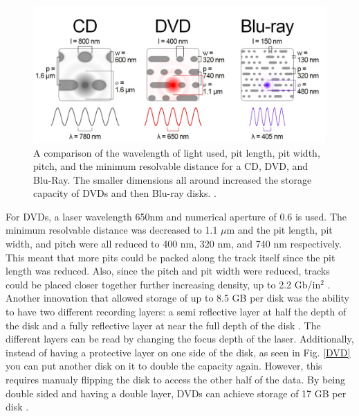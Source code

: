 \documentclass[ notitlepage, numerical, 11pt]{revtex4-1} %
\begin{document}
\begin{figure}[H]
\centerline{\includegraphics[scale=.55]{comparison.jpg}}
\caption{A comparison of the wavelength of light used, pit length, pit width, pitch, and the minimum resolvable distance for a CD, DVD, and Blu-Ray. The smaller dimensions all around increased the storage capacity of DVDs and then Blu-ray disks. \cite{wikiHolo}.}
\label{comparison}
\end{figure} 
For DVDs, a laser wavelength 650nm and numerical aperture of 0.6 is used. The minimum resolvable distance was decreased to 1.1 $\mu$m and the pit length, pit width, and pitch were all reduced to 400 nm, 320 nm, and 740 nm respectively. This meant that more pits could be packed along the track itself since the pit length was reduced. Also, since the pitch and pit width were reduced, tracks could be placed closer together further increasing density, up to 2.2 Gb/in$^2$ \cite{wikiHolo}. Another innovation that allowed storage of up to 8.5 GB per disk was the ability to have two different recording layers: a semi reflective layer at half the depth of the disk and a fully reflective layer at near the full depth of the disk \cite{memory}. 
The different layers can be read by changing the focus depth of the laser. Additionally, instead of having a protective layer on one side of the disk, as seen in Fig. \ref{DVD} you can put another disk on it to double the capacity again. However, this requires manualy flipping the disk to access the other half of the data. By being double sided and having a double layer, DVDs can achieve storage of 17 GB per disk \cite{memory}.
\end{document}
